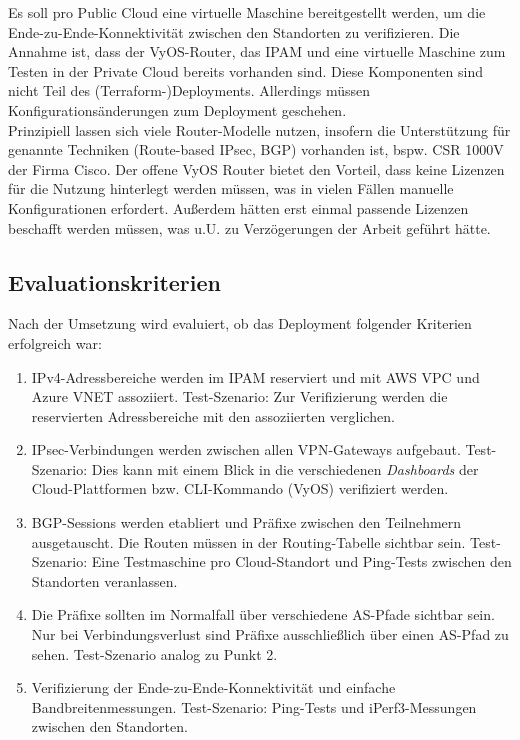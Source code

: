 Es soll pro Public Cloud eine virtuelle Maschine bereitgestellt werden, um die Ende-zu-Ende-Konnektivität zwischen den Standorten zu verifizieren.
Die Annahme ist, dass der VyOS-Router, das \gls{IPAM} und eine virtuelle Maschine zum Testen in der Private Cloud bereits vorhanden sind. Diese Komponenten sind nicht Teil des (Terraform-)Deployments. Allerdings müssen Konfigurationsänderungen zum \gls{Deployment} geschehen.\\
Prinzipiell lassen sich viele Router-Modelle nutzen, insofern die Unterstützung für genannte Techniken (Route-based \gls{IPsec}, \gls{BGP}) vorhanden ist, bspw. CSR 1000V der Firma Cisco\cite{Durai2016}. Der offene VyOS Router bietet den Vorteil, dass keine Lizenzen für die Nutzung hinterlegt werden müssen, was in vielen Fällen manuelle Konfigurationen erfordert. Außerdem hätten erst einmal passende Lizenzen beschafft werden müssen, was u.U. zu Verzögerungen der Arbeit geführt hätte.
\subsection{Evaluationskriterien}\label{eval-kriterien-uc1}
Nach der Umsetzung wird evaluiert, ob das \gls{Deployment} folgender Kriterien erfolgreich war:
\begin{enumerate}
    \item IPv4-Adressbereiche werden im \gls{IPAM} reserviert und mit AWS \gls{VPC} und Azure \gls{VNET} assoziiert. Test-Szenario: Zur Verifizierung werden die reservierten Adressbereiche mit den assoziierten verglichen.
    \item \gls{IPsec}-Verbindungen werden zwischen allen \gls{VPN-Gateway}s aufgebaut. Test-Szenario: Dies kann mit einem Blick in die verschiedenen \textit{Dashboards} der Cloud-Plattformen bzw. CLI-Kommando (VyOS) verifiziert werden.
    \item \gls{BGP}-Sessions werden etabliert und Präfixe zwischen den Teilnehmern ausgetauscht. Die Routen müssen in der Routing-Tabelle sichtbar sein. Test-Szenario: Eine Testmaschine pro Cloud-Standort und Ping-Tests zwischen den Standorten veranlassen.
    \item Die Präfixe sollten im Normalfall über verschiedene \gls{AS}-Pfade sichtbar sein. Nur bei Verbindungsverlust sind Präfixe ausschließlich über einen \gls{AS}-Pfad zu sehen. Test-Szenario analog zu Punkt 2.
    \item Verifizierung der Ende-zu-Ende-Konnektivität und einfache Bandbreitenmessungen. Test-Szenario: Ping-Tests und iPerf3-Messungen zwischen den Standorten.
\end{enumerate}
